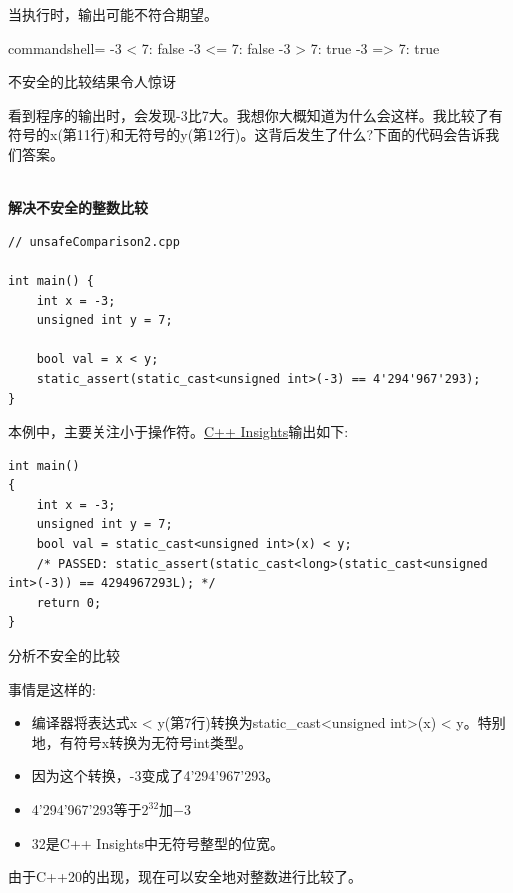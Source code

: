 当执行时，输出可能不符合期望。

\begin{tcblisting}{commandshell={}}
-3 < 7: false
-3 <= 7: false
-3 > 7: true
-3 => 7: true
\end{tcblisting}

\begin{center}
不安全的比较结果令人惊讶
\end{center}

看到程序的输出时，会发现-3比7大。我想你大概知道为什么会这样。我比较了有符号的x(第11行)和无符号的y(第12行)。这背后发生了什么?下面的代码会告诉我们答案。

\hspace*{\fill} \\ %
\noindent
\textbf{解决不安全的整数比较}
\begin{lstlisting}[style=styleCXX]
// unsafeComparison2.cpp

int main() {
	int x = -3;
	unsigned int y = 7;
	
	bool val = x < y;
	static_assert(static_cast<unsigned int>(-3) == 4'294'967'293);
}
\end{lstlisting}

本例中，主要关注小于操作符。\href{https://cppinsights.io/s/62732a01}{C++ Insights}输出如下:

\begin{lstlisting}[style=styleCXX]
int main()
{
	int x = -3;
	unsigned int y = 7;
	bool val = static_cast<unsigned int>(x) < y;
	/* PASSED: static_assert(static_cast<long>(static_cast<unsigned int>(-3)) == 4294967293L); */
	return 0;
}
\end{lstlisting}
\begin{center}
分析不安全的比较
\end{center}

事情是这样的:

\begin{itemize}
\item 
编译器将表达式x < y(第7行)转换为static\_cast<unsigned int>(x) < y。特别地，有符号x转换为无符号int类型。

\item 
因为这个转换，-3变成了4'294'967'293。

\item 
4'294'967'293等于$ 2^{32} $加−3

\item 
32是C++ Insights中无符号整型的位宽。
\end{itemize}

由于C++20的出现，现在可以安全地对整数进行比较了。

